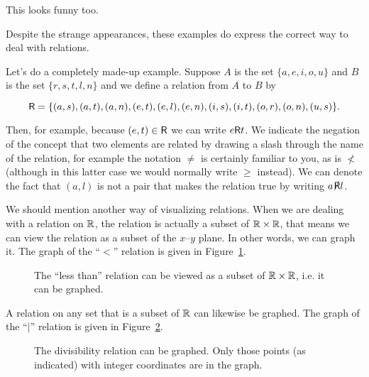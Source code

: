 \noindent This looks funny too.  

Despite the strange appearances, these 
examples do express the correct way to deal with relations.

Let's do a completely made-up example.  Suppose $A$ is the set
$\{a,e,i,o,u\}$ and $B$ is the set $\{r,s,t,l,n\}$ and we define 
a relation from $A$ to $B$ by

\[ \mbox{\textsf R} = \{ (a,s), (a,t), (a,n), (e,t), (e,l), (e,n), (i,s), (i,t), (o,r), (o,n), (u,s) \}. \]

Then, for example, because $(e,t) \in \mbox{\textsf R}$ we can write $e \mbox{\textsf R} t$.  We indicate the
negation of the concept that two elements are related by drawing a slash 
through the name of the relation, for example the notation $\neq$ is certainly
familiar to you, as is $\nless$ (although in this latter case we 
would normally write $\geq$ instead).  We can denote the fact that
$(a,l)$ is not a pair that makes the relation true by writing $a \nrelR l$.

We should mention another way of visualizing
relations.  When we are dealing with a relation on ${\mathbb R}$, the
relation is actually a subset of ${\mathbb R} \times {\mathbb R}$, that means 
we can view the relation as a subset of the $x$--$y$ plane.  In other 
words, we can graph it.  The graph of the ``$<$'' relation is
given in Figure~\ref{fig:lt_graph}.

\begin{figure}[!hbtp]
\begin{center}

\end{center}
\caption[The graph of the ``less than'' relation.]{The ``less than'' relation %
can be viewed as a subset of ${\mathbb R} \times {\mathbb R}$, i.e. it can be graphed.}
\label{fig:lt_graph} 
\end{figure}
  
A relation on any set that is a subset of ${\mathbb R}$ can likewise be
graphed.  The graph of the ``$\mid$'' relation is
given in Figure~\ref{fig:div_graph}.

\begin{figure}[!hbtp]
\begin{center}

\end{center}
\caption[The graph of the divisibility relation.]{The divisibility relation %
can be graphed.  Only those points (as indicated) with integer coordinates %
are in the graph.}
\label{fig:div_graph} 
\end{figure}
 
